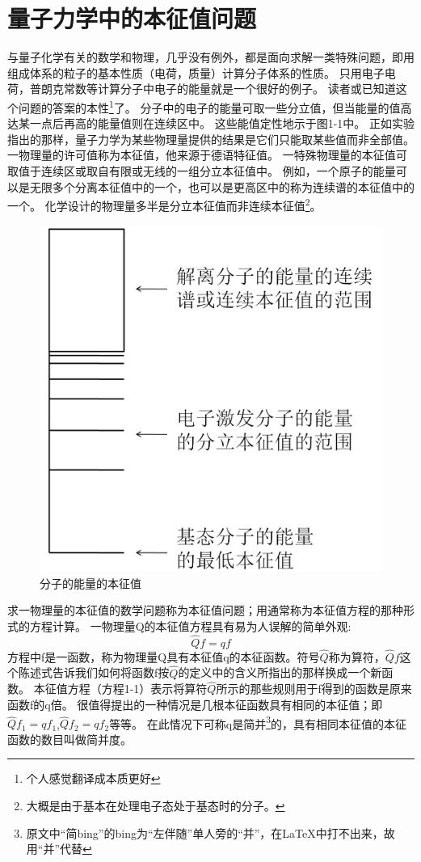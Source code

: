 \section{量子力学中的本征值问题}
与量子化学有关的数学和物理，几乎没有例外，都是面向求解一类特殊问题，即用组成体系的粒子的基本性质（电荷，质量）计算分子体系的性质。
只用电子电荷，普朗克常数等计算分子中电子的能量就是一个很好的例子。
读者或已知道这个问题的答案的本性\footnote{个人感觉翻译成本质更好}了。
分子中的电子的能量可取一些分立值，但当能量的值高达某一点后再高的能量值则在连续区中。
这些能值定性地示于图1-1中。
正如实验指出的那样，量子力学为某些物理量提供的结果是它们只能取某些值而非全部值。
一物理量的许可值称为本征值，他来源于德语特征值。
一特殊物理量的本征值可取值于连续区或取自有限或无线的一组分立本征值中。
例如，一个原子的能量可以是无限多个分离本征值中的一个，也可以是更高区中的称为连续谱的本征值中的一个。
化学设计的物理量多半是分立本征值而非连续本征值\footnote{大概是由于基本在处理电子态处于基态时的分子。}。
\begin{figure}[htbp]
    \center
    \includegraphics[scale=0.15]{./fig/1-1.png}
    \caption{分子的能量的本征值}
\end{figure}
求一物理量的本征值的数学问题称为本征值问题；用通常称为本征值方程的那种形式的方程计算。
一物理量Q的本征值方程具有易为人误解的简单外观:
\[\hat{Q}f=qf \tag{1-1}\]
方程中f是一函数，称为物理量Q具有本征值q的本征函数。符号$\hat{Q}$称为算符，$\hat{Q}f$这个陈述式告诉我们如何将函数f按$\hat{Q}$的定义中的含义所指出的那样换成一个新函数。
本征值方程（方程1-1）表示将算符$\hat{Q}$所示的那些规则用于f得到的函数是原来函数f的q倍。
很值得提出的一种情况是几根本征函数具有相同的本征值；即$\hat{Q}f_1=qf_1$,$\hat{Q}f_2=qf_2$等等。
在此情况下可称q是简并\footnote{原文中“简bing”的bing为“左伴随”单人旁的“并”，在LaTeX中打不出来，故用“并”代替}的，具有相同本征值的本征函数的数目叫做简并度。

